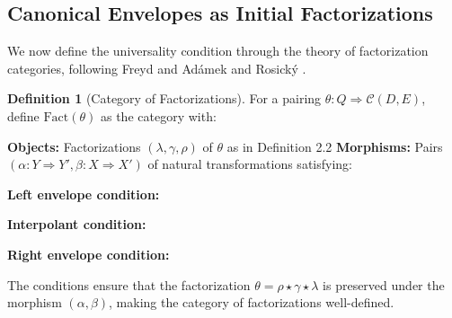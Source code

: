 \documentclass[11pt]{article}
\theoremstyle{plain}
\theoremstyle{definition}
\newtheorem{definition}[theorem]{Definition}
\theoremstyle{remark}
\newcommand{\C}{\mathcal{C}}
\newcommand{\Fact}{\mathrm{Fact}}
\begin{document}
\subsection{Canonical Envelopes as Initial Factorizations}

We now define the universality condition through the theory of factorization categories, following Freyd \cite{freyd1964abelian} and  Ad\'{a}mek and Rosick\'{y} \cite{adamek1994locally}.

\begin{definition}[Category of Factorizations]
For a pairing $\theta : Q \Rightarrow \C(D, E)$, define $\Fact(\theta)$ as the category with:

\textbf{Objects:} Factorizations $(\lambda, \gamma, \rho)$ of $\theta$ as in Definition 2.2
\textbf{Morphisms:} Pairs $(\alpha : Y \Rightarrow Y', \beta : X \Rightarrow X')$ of natural transformations satisfying:

\textbf{Left envelope condition:}
\begin{center}
\end{center}


\textbf{Interpolant condition:}
\begin{center}
\end{center}

\textbf{Right envelope condition:}
\begin{center}
\end{center}

The conditions ensure that the factorization $\theta = \rho \star \gamma \star \lambda$ is preserved under the morphism $(\alpha, \beta)$, making the category of factorizations well-defined.
\end{definition}
\end{document}
